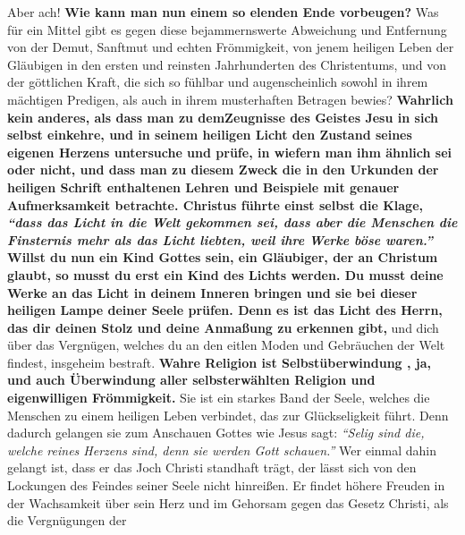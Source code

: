 Aber ach! \textbf{Wie kann man nun einem so elenden Ende vorbeugen?} Was für ein
Mittel
gibt es gegen diese bejammernswerte Abweichung und Entfernung von der Demut,
Sanftmut und echten Frömmigkeit, von jenem heiligen Leben der Gläubigen in den
ersten und reinsten Jahrhunderten des Christentums, und von der göttlichen
Kraft, die sich so fühlbar und augenscheinlich sowohl in ihrem mächtigen
Predigen, als auch in ihrem musterhaften Betragen bewies? \textbf{Wahrlich kein
anderes,
als dass man zu demZeugnisse des Geistes Jesu in sich
selbst einkehre, und in
seinem heiligen Licht den Zustand seines eigenen Herzens untersuche und prüfe,
in wiefern man ihm ähnlich sei oder nicht, und dass man zu diesem Zweck die in
den Urkunden der heiligen Schrift enthaltenen
Lehren und
Beispiele mit genauer
Aufmerksamkeit betrachte. Christus führte einst selbst die Klage,
\textit{"`dass das
Licht in die Welt gekommen sei, dass aber die Menschen die Finsternis mehr als
das Licht liebten, weil ihre Werke böse waren."'}
Willst du
nun ein Kind Gottes sein, ein Gläubiger, der an
Christum
glaubt, so musst du erst
ein Kind des Lichts werden. Du musst deine
Werke an das
Licht in deinem Inneren
bringen und sie bei dieser heiligen Lampe deiner Seele prüfen. Denn es ist das
Licht des Herrn, das dir deinen Stolz und deine Anmaßung zu erkennen gibt,}
und
dich über das Vergnügen, welches du an den eitlen Moden und
Gebräuchen der Welt
findest, insgeheim bestraft.
\label{ref:12_11_eitle_menschen_erloesung}
\textbf{Wahre Religion ist Selbstüberwindung
, ja,
und auch Überwindung
aller selbsterwählten Religion und eigenwilligen
Frömmigkeit. } Sie
ist ein starkes Band der Seele, welches die Menschen zu einem heiligen Leben
verbindet, das zur Glückseligkeit führt. Denn dadurch
gelangen sie zum Anschauen
Gottes wie Jesus sagt:
\textit{"`Selig sind die, welche reines Herzens sind, denn sie
werden Gott schauen."'}
Wer einmal dahin gelangt ist, dass
er das Joch Christi standhaft trägt, der lässt sich von den Lockungen des
Feindes
seiner Seele nicht hinreißen. Er findet höhere Freuden in der Wachsamkeit über
sein Herz und im Gehorsam gegen das Gesetz Christi,
als die Vergnügungen der
